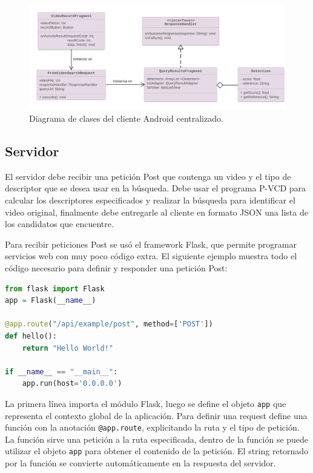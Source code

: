 	\begin{figure}[!h]
		\centering
		\includegraphics[scale=1.6]{imagenes/cap4/diagrama_cliente_centralizado.png}
		\caption{Diagrama de clases del cliente Android centralizado.}
		\label{diagrama_clases_centralizado}
	\end{figure}

\subsection{Servidor}

El servidor debe recibir una petición Post que contenga un video y el tipo de descriptor que se desea usar en la búsqueda. Debe usar el programa P-VCD para calcular los descriptores especificados y realizar la búsqueda para identificar el video original, finalmente debe entregarle al cliente en formato JSON una lista de los candidatos que encuentre.

Para recibir peticiones Post se usó el framework Flask, que permite programar servicios web con muy poco código extra. El siguiente ejemplo muestra todo el código necesario para definir y responder una petición Post:
\begin{lstlisting}[language=python]
from flask import Flask
app = Flask(__name__)

@app.route("/api/example/post", method=['POST'])
def hello():
	return "Hello World!"
	
if __name__ == "__main__":
	app.run(host='0.0.0.0')
\end{lstlisting}

La primera línea importa el módulo Flask, luego se define el objeto \texttt{app} que representa el contexto global de la aplicación. Para definir una request define una función con la anotación \texttt{@app.route}, explicitando la ruta y el tipo de petición. La función sirve una petición a la ruta especificada, dentro de la función se puede utilizar el objeto \texttt{app} para obtener el contenido de la petición. El string retornado por la función se convierte automáticamente en la respuesta del servidor.

